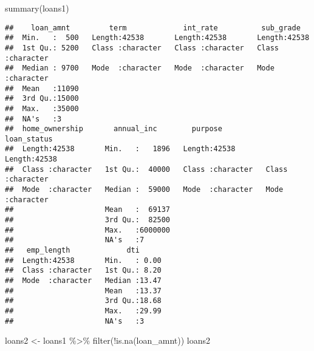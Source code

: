 \documentclass[
]{article}
\newenvironment{Shaded}{\begin{snugshade}}{\end{snugshade}}
\newcommand{\FunctionTok}[1]{\textcolor[rgb]{0.00,0.00,0.00}{#1}}
\newcommand{\NormalTok}[1]{#1}
\newcommand{\OtherTok}[1]{\textcolor[rgb]{0.56,0.35,0.01}{#1}}
\newcommand{\SpecialCharTok}[1]{\textcolor[rgb]{0.00,0.00,0.00}{#1}}
\begin{document}
\begin{Shaded}
\begin{Highlighting}[]
\FunctionTok{summary}\NormalTok{(loans1)}
\end{Highlighting}
\end{Shaded}

\begin{verbatim}
##    loan_amnt         term             int_rate          sub_grade        
##  Min.   :  500   Length:42538       Length:42538       Length:42538      
##  1st Qu.: 5200   Class :character   Class :character   Class :character  
##  Median : 9700   Mode  :character   Mode  :character   Mode  :character  
##  Mean   :11090                                                           
##  3rd Qu.:15000                                                           
##  Max.   :35000                                                           
##  NA's   :3                                                               
##  home_ownership       annual_inc        purpose          loan_status       
##  Length:42538       Min.   :   1896   Length:42538       Length:42538      
##  Class :character   1st Qu.:  40000   Class :character   Class :character  
##  Mode  :character   Median :  59000   Mode  :character   Mode  :character  
##                     Mean   :  69137                                        
##                     3rd Qu.:  82500                                        
##                     Max.   :6000000                                        
##                     NA's   :7                                              
##   emp_length             dti       
##  Length:42538       Min.   : 0.00  
##  Class :character   1st Qu.: 8.20  
##  Mode  :character   Median :13.47  
##                     Mean   :13.37  
##                     3rd Qu.:18.68  
##                     Max.   :29.99  
##                     NA's   :3
\end{verbatim}

\begin{Shaded}
\begin{Highlighting}[]
\NormalTok{loans2 }\OtherTok{\textless{}{-}}\NormalTok{ loans1 }\SpecialCharTok{\%\textgreater{}\%}
  \FunctionTok{filter}\NormalTok{(}\SpecialCharTok{!}\FunctionTok{is.na}\NormalTok{(loan\_amnt))}
\NormalTok{loans2}
\end{Highlighting}
\end{Shaded}
\end{document}
